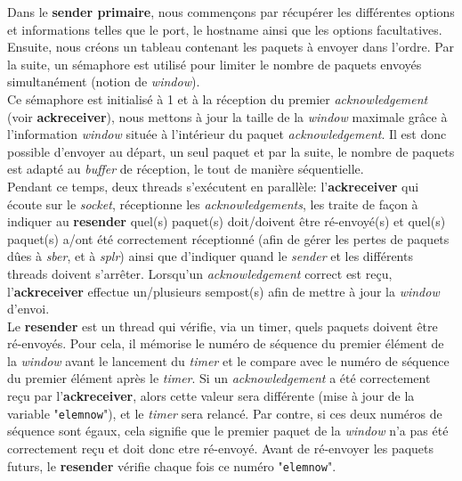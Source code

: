 \documentclass[11pt]{article}
\begin{document}
Dans le \textbf{sender primaire}, nous commençons par récupérer les différentes options et informations telles que le port, le hostname ainsi que les options facultatives. Ensuite, nous créons un tableau contenant les paquets à envoyer dans l'ordre. Par la suite, un sémaphore est utilisé pour limiter le nombre de paquets envoyés simultanément (notion de \textit{window}). \\

\smallskip 
Ce sémaphore est initialisé à 1 et à la réception du premier \textit{acknowledgement} (voir \textbf{ackreceiver}), nous mettons à jour la taille de la \textit{window} maximale grâce à l'information \textit{window} située à l'intérieur du paquet \textit{acknowledgement}. Il est donc possible d'envoyer au départ, un seul paquet et par la suite, le nombre de paquets est adapté au \textit{buffer} de réception, le tout de manière séquentielle. \\

\smallskip
Pendant ce temps, deux threads s'exécutent en parallèle: 
l'\textbf{ackreceiver} qui écoute sur le \textit{socket}, réceptionne les \textit{acknowledgements}, les traite de façon à indiquer au \textbf{resender} quel(s) paquet(s) doit/doivent être ré-envoyé(s) et quel(s) paquet(s) a/ont été correctement réceptionné (afin de gérer les pertes de paquets dûes à \textit{sber}, et à \textit{splr}) ainsi que d'indiquer quand le \textit{sender} et les différents threads doivent s'arrêter. Lorsqu'un \textit{acknowledgement} correct est reçu, l'\textbf{ackreceiver} effectue un/plusieurs sempost(s) afin de mettre à jour la \textit{window} d'envoi. \\ 

\smallskip
Le \textbf{resender} est un thread qui vérifie, via un timer, quels paquets doivent être ré-envoyés. Pour cela, il mémorise le numéro de séquence du premier élément de la \textit{window} avant le lancement du \textit{timer} et le compare avec le numéro de séquence du premier élément après le \textit{timer}. Si un \textit{acknowledgement} a été correctement reçu par l'\textbf{ackreceiver}, alors cette valeur sera différente (mise à jour de la variable "\texttt{elemnow}"), et le \textit{timer} sera relancé. Par contre, si ces deux numéros de séquence sont égaux, cela signifie que le premier paquet de la \textit{window} n'a pas été correctement reçu et doit donc etre ré-envoyé. Avant de ré-envoyer les paquets futurs, le \textbf{resender} vérifie chaque fois ce numéro "\texttt{elemnow}". 
\end{document}

